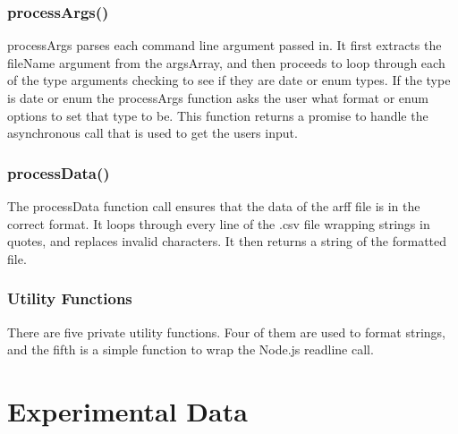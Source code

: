\documentclass[11pt]{article} %
\begin{document}
\subsubsection{processArgs()}
processArgs parses each command line argument passed in. It first extracts the fileName argument from the argsArray, and then proceeds to loop through each of the type arguments checking to see if they are date or enum types. If the type is date or enum the processArgs function asks the user what format or enum options to set that type to be. This function returns a promise to handle the asynchronous call that is used to get the users input.

\subsubsection{processData()}
The processData function call ensures that the data of the arff file is in the correct format. It loops through every line of the .csv file wrapping strings in quotes, and replaces invalid characters. It then returns a string of the formatted file.

\subsubsection{Utility Functions}
There are five private utility functions. Four of them are used to format strings, and the fifth is a simple function to wrap the Node.js readline call.

\section{Experimental Data}
\end{document}
